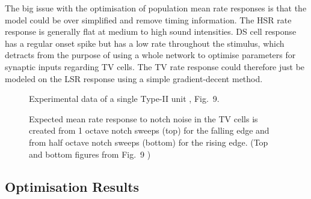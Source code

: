 

The big issue with the optimisation of population mean rate responses is that
the model could be over simplified and remove timing information.  The HSR rate
response is generally flat at medium to high sound intensities. DS cell response
has a regular onset spike but has a low rate throughout the stimulus, which
detracts from the purpose of using a whole network to optimise parameters for
synaptic inputs regarding TV cells.  The TV rate response could therefore just
be modeled on the LSR response using a simple gradient-decent
method. 
 

\begin{figure}[htb]
  \centering
  \caption{Experimental data of a single Type-II \DCN unit
    \citep{ReissYoung:2005}, Fig.~9.}
  \label{fig:TVReissFig9}
\end{figure}


\begin{figure}[htb]
  \centering
  \caption{Expected mean rate response to notch noise in the TV cells is created
    from 1 octave notch sweeps (top) for the falling edge and from half octave
    notch sweeps (bottom) for the rising edge. (Top and bottom figures from
    Fig.~9 \citep*{ReissYoung:2005})}
  \label{fig:TVNotchDiagram}
\end{figure}

%




\subsection{Optimisation Results} 


